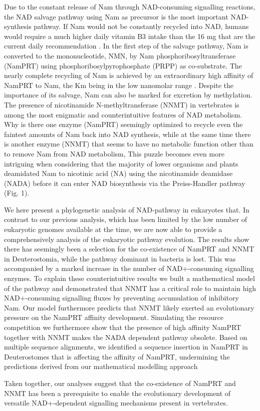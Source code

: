Due to the constant release of Nam through NAD-consuming signalling reactions, the NAD salvage pathway using Nam as precursor is the most important NAD-synthesis pathway.  If Nam would not be constantly recycled into NAD, humans would require a much higher daily vitamin B3 intake than the 16 mg that are the current daily recommendation \cite{CommissionofEuropeanCommunities2008}.  In the first step of the salvage pathway, Nam is converted to the mononucleotide, NMN, by Nam phosphoribosyltransferase (NamPRT) using phosphoribosylpyrophosphate (PRPP) as co-substrate. The nearly complete recycling of Nam is achieved by an extraordinary high affinity of NamPRT to Nam, the Km being in the low nanomolar range \cite{Burgos2008}. Despite the importance of its salvage, Nam can also be marked for excretion by methylation. The presence of nicotinamide N-methyltransferase (NNMT) in vertebrates \cite{Gossmann2012FEBS} is among the most enigmatic and counterintuitive features of NAD metabolism. Why is there one enzyme (NamPRT) seemingly optimized to recycle even the faintest amounts of Nam back into NAD synthesis, while at the same time there is another enzyme (NNMT) that seems to have no metabolic function other than to remove Nam from NAD metabolism, This puzzle becomes even more intriguing when considering that the majority of lower organisms and plants deamidated Nam to nicotinic acid (NA) using the nicotinamide deamidase (NADA) before it can enter NAD biosynthesis via the Preiss-Handler pathway (Fig. 1).

We here present a phylogenetic analysis of NAD-pathway in eukaryotes that. In contrast to our previous analysis, which has been limited by the low number of eukaryotic genomes available at the time, we are now able to provide a comprehensively analysis of the eukaryotic pathway evolution. The results show there has seemingly been a selection for the co-existence of NamPRT and NNMT in Deuterostomia, while the pathway dominant in bacteria is lost. This was accompanied by a marked increase in the number of  NAD+-consuming signalling enzymes. To explain these counterintuitive results we built a mathematical model of the pathway and demonstrated that NNMT has a critical role to maintain high NAD+-consuming signalling fluxes by preventing accumulation of inhibitory Nam. Our model furthermore predicts that NNMT likely exerted an evolutionary pressure on the NamPRT affinity development. Simulating the resource competition we furthermore show that the presence of high affinity NamPRT together with NNMT makes the NADA dependent pathway obsolete.  Based on multiple sequence alignments,  we identified a sequence insertion in NamPRT in Deuterostomes  that is affecting the affinity of NamPRT,  undermining the predictions derived from our mathematical modelling approach 

Taken together, our analyses suggest that the co-existence of NamPRT and NNMT has been a prerequisite to enable the evolutionary development of versatile NAD+-dependent signalling mechanisms present in vertebrates.
